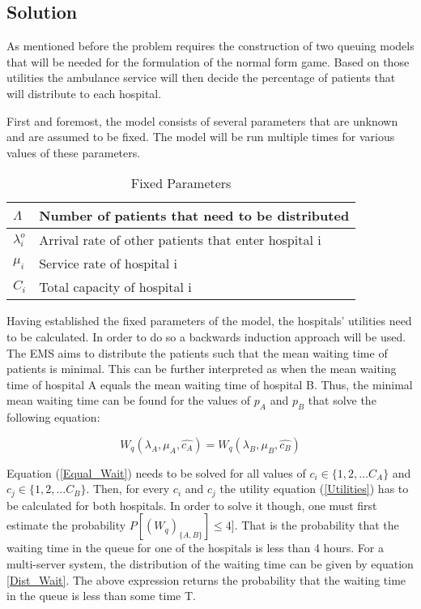 \documentclass{article}
\begin{document}
\subsection{Solution}
As mentioned before the problem requires the construction of two queuing models that will be needed for the formulation of the normal form game. Based on those utilities the ambulance service will then decide the percentage of patients that will distribute to each hospital. 

First and foremost, the model consists of several parameters that are unknown and are assumed to be fixed. The model will be run multiple times for various values of these parameters.


\begin{table}[h]
    \centering
    \begin{tabular}{|l|l|}
        \hline
        \( \Lambda \) & Number of patients that need to be distributed \\ \hline
        \( \lambda_i^o \) & Arrival rate of other patients that enter hospital i \\ \hline
        \( \mu_i \) & Service rate of hospital i \\ \hline
        \( C_i \) & Total capacity of hospital i \\ \hline
    \end{tabular}
    \caption{Fixed Parameters}
\end{table}

Having established the fixed parameters of the model, the hospitals' utilities need to be calculated. In order to do so a backwards induction approach will be used. The EMS aims to distribute the patients such that the mean waiting time of patients is minimal. This can be further interpreted as when the mean waiting time of hospital A equals the mean waiting time of hospital B. Thus, the minimal mean waiting time can be found for the values of \( p_A \) and \( p_B \) that solve the following equation:

\begin{equation}\label{Equal_Wait}
    W_q(\lambda_A, \mu_A, \hat{c_A}) = W_q(\lambda_B, \mu_B, \hat{c_B})
\end{equation}

Equation (\ref{Equal_Wait}) needs to be solved for all values of \( c_i \in \{1,2, \dots C_A\} \) and \( c_j \in \{1,2, \dots C_B\} \). Then, for every \( c_i \) and \( c_j \) the utility equation (\ref{Utilities}) has to be calculated for both hospitals. In order to solve it though, one must first estimate the probability \( P[(W_q)_{\{A, B\}}] \leq 4] \). That is the probability that the waiting time in the queue for one of the hospitals is less than 4 hours. For a multi-server system, the distribution of the waiting time can be given by equation \ref{Dist_Wait}. The above expression returns the probability that the waiting time in the queue is less than some time T.
\end{document}
